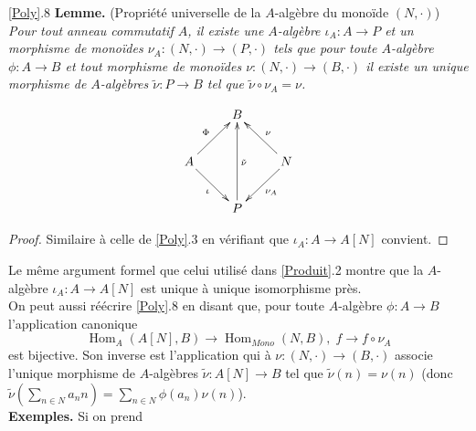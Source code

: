 \documentclass[a4paper, oneside, 12pt]{book}
\theoremstyle{theoremeStyle} %
\theoremstyle{definition} %
\DeclareMathOperator{\SHom}{Hom}
\begin{document}
 \ref{Poly}.8 \textbf{Lemme.} (Propriété universelle de la $A$-algèbre du monoïde $(N,\cdot)$) \textit{Pour tout anneau commutatif $A$, il existe une $A$-algèbre $\iota_A: A\rightarrow P$ et un  morphisme de monoïdes $\nu_A:(N,\cdot)\rightarrow (P  ,\cdot)$ tels que pour toute $A$-algèbre   $\phi: A\rightarrow B$ et tout morphisme de monoïdes $\nu:(N,\cdot)\rightarrow (B  ,\cdot)$  il existe un unique  morphisme de $A$-algèbres $\tilde{\nu}:P\rightarrow B$  tel que $ \tilde{\nu}\circ \nu_A=\nu$. }

	$$ \xymatrix{ & B \\ A \ar[ru]^\Phi \ar[rd]_\iota & & N \ar[lu]_\nu \ar[ld]^{\nu_A} \\ & P \ar[uu]_{\tilde{\nu} } } $$

\begin{proof} Similaire à celle de \ref{Poly}.3 en vérifiant que $\iota_A:A\rightarrow A[N]$ convient. \end{proof}

  Le même argument  formel que celui utilisé dans \ref{Produit}.2 montre que la $A$-algèbre $\iota_A: A\rightarrow A[N]$ est unique à unique isomorphisme  près.\\

  On peut aussi réécrire \ref{Poly}.8 en disant que, pour toute $A$-algèbre $\phi:A\rightarrow B$  l'application canonique
$$\SHom_A(A[N],B)\rightarrow\SHom_{Mono}(N,B),\; f\rightarrow f\circ\nu_A$$
 est bijective. Son inverse est l'application qui à $\nu:(N,\cdot)\rightarrow (B,\cdot) $ associe l'unique morphisme de $A$-algèbres $ \tilde{\nu}:A[N]\rightarrow B$ tel que $ \tilde{\nu}(n)=\nu(n)$ (donc $\tilde{\nu}(\sum_{n\in N}a_nn)=\sum_{n\in N}\phi(a_n)\nu(n)$).\\

  \textbf{Exemples.} Si on prend\\
\end{document}

